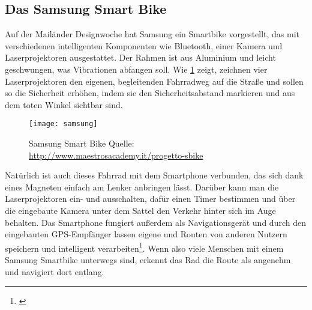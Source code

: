 \subsection{Das Samsung Smart Bike}
Auf der Mailänder Designwoche hat Samsung ein Smartbike vorgestellt, das mit verschiedenen intelligenten Komponenten wie Bluetooth, einer Kamera und Laserprojektoren ausgestattet. Der Rahmen ist aus Aluminium und leicht geschwungen, was Vibrationen abfangen soll. Wie \ref{fig:samsung} zeigt, zeichnen vier Laserprojektoren den eigenen, begleitenden Fahrradweg auf die Straße und sollen so die Sicherheit erhöhen, indem sie den Sicherheitsabstand markieren und aus dem toten Winkel sichtbar sind. 
\begin{figure}[H]
    \centering
    \texttt{[image: samsung]}
    \caption[Samsung Smart Bike]{Samsung Smart Bike  Quelle: \url{http://www.maestrosacademy.it/progetto-sbike}} \label{fig:samsung}
\end{figure}
Natürlich ist auch dieses Fahrrad mit dem Smartphone verbunden, das sich dank eines Magneten einfach am Lenker anbringen lässt. Darüber kann man die Laserprojektoren ein- und ausschalten, dafür einen Timer bestimmen und über die eingebaute Kamera unter dem Sattel den Verkehr hinter sich im Auge behalten. Das Smartphone fungiert außerdem als Navigationsgerät und durch den eingebauten \gls{GPS}-Empfänger lassen eigene und Routen von anderen Nutzern speichern und intelligent verarbeiten\footnote{\cite{smartbike}}. Wenn also viele Menschen mit einem Samsung Smartbike unterwegs sind, erkennt das Rad die Route als angenehm und navigiert dort entlang. 
